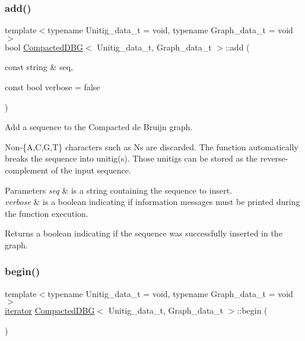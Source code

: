 \subsubsection{\texorpdfstring{add()}{add()}}
{\footnotesize\ttfamily template$<$typename Unitig\+\_\+data\+\_\+t = void, typename Graph\+\_\+data\+\_\+t = void$>$ \\
bool \hyperlink{classCompactedDBG}{Compacted\+D\+BG}$<$ Unitig\+\_\+data\+\_\+t, Graph\+\_\+data\+\_\+t $>$\+::add (\begin{DoxyParamCaption}\item[{const string \&}]{seq,  }\item[{const bool}]{verbose = {\ttfamily false} }\end{DoxyParamCaption})}



Add a sequence to the Compacted de Bruijn graph. 

Non-\/\{A,C,G,T\} characters such as Ns are discarded. The function automatically breaks the sequence into unitig(s). Those unitigs can be stored as the reverse-\/complement of the input sequence. 
\begin{DoxyParams}{Parameters}
{\em seq} & is a string containing the sequence to insert. \\
\hline
{\em verbose} & is a boolean indicating if information messages must be printed during the function execution. \\
\hline
\end{DoxyParams}
\begin{DoxyReturn}{Returns}
a boolean indicating if the sequence was successfully inserted in the graph. 
\end{DoxyReturn}
\mbox{\label{classCompactedDBG_aafac845b848ae5cf79f1f818db6c2ecc}} 
\subsubsection{\texorpdfstring{begin()}{begin()}\hspace{0.1cm}{\footnotesize\ttfamily [1/2]}}
{\footnotesize\ttfamily template$<$typename Unitig\+\_\+data\+\_\+t = void, typename Graph\+\_\+data\+\_\+t = void$>$ \\
\hyperlink{classCompactedDBG_af4a6df70628f698d9a2ee843b5359883}{iterator} \hyperlink{classCompactedDBG}{Compacted\+D\+BG}$<$ Unitig\+\_\+data\+\_\+t, Graph\+\_\+data\+\_\+t $>$\+::begin (\begin{DoxyParamCaption}{ }\end{DoxyParamCaption})}



